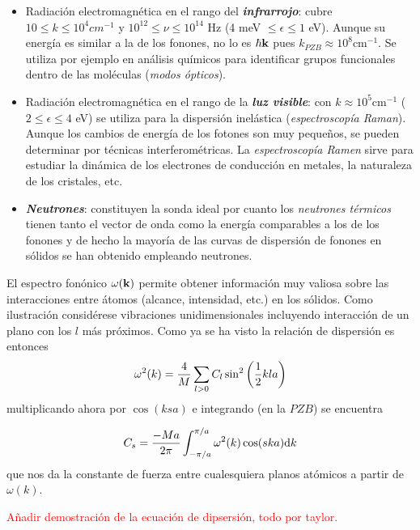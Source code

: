 \begin{itemize}
    \item Radiación electromagnética en el rango del \textbf{\textit{infrarrojo}}: cubre $10\le k \le 10^4 \unit{cm^{-1}}$ y $10^{12} \leq \nu \leq 10^{14}$ Hz (4 meV $\leq \epsilon \leq 1$ eV). Aunque su energía es similar a la de los fonones, no lo es $\hbar \mathbf{k}$ pues $k_{PZB} \approx 10^8  \unit{\cm^{-1}}$. Se utiliza por ejemplo en análisis químicos para identificar grupos funcionales dentro de las moléculas (\textit{modos ópticos}).
    \item Radiación electromagnética en el rango de la \textbf{\textit{luz visible}}: con $k\approx 10^5 \unit{\cm^{-1}}$ ($2\leq \epsilon \leq 4$ eV) se utiliza para la dispersión inelástica (\textit{espectroscopía Raman}). Aunque los cambios de energía de los fotones son muy pequeños, se pueden determinar por técnicas interferométricas. La \textit{espectroscopía Ramen} sirve para estudiar la dinámica de los electrones de conducción en metales, la naturaleza de los cristales, etc.
    \item \textbf{\textit{Neutrones}}: constituyen la sonda ideal por cuanto los \textit{neutrones térmicos} tienen tanto el vector de onda como la energía comparables a los de los fonones y de hecho la mayoría de las curvas de dispersión de fonones en sólidos se han obtenido empleando neutrones.
\end{itemize}


El espectro fonónico $\omega (\mathbf{k})$ permite obtener información muy valiosa sobre las interacciones entre átomos (alcance, intensidad, etc.) en los sólidos. Como ilustración considérese vibraciones unidimensionales incluyendo interacción de un plano con los $l$ más próximos. Como ya se ha visto la relación de dispersión es entonces
\begin{equation}
    \omega^2 (k) = \frac{4}{M} \sum_{l>0} C_l \sin^2 \left( \frac{1}{2} k la \right)
\end{equation}
multiplicando ahora por $\cos (ksa)$ e integrando (en la $PZB$) se encuentra

\begin{equation}
    C_s = \frac{-Ma}{2\pi} \int_{-\pi/a}^{\pi/a} \omega^2 (k) \cos (ska) \mathrm{d} k
\end{equation}
que nos da la constante de fuerza entre cualesquiera planos atómicos a partir de $\omega (k)$.



\begin{Anotacion}
	\textcolor{red}{Añadir demostración de la ecuación de dipsersión, todo por taylor.}
\end{Anotacion}	

